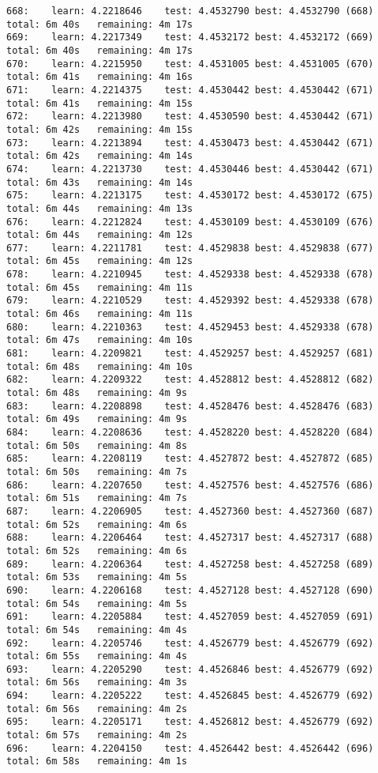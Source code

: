 \documentclass[11pt]{article}
\begin{document}
\begin{Verbatim}[commandchars=\\\{\}]
668:	learn: 4.2218646	test: 4.4532790	best: 4.4532790 (668)	total: 6m 40s	remaining: 4m 17s
669:	learn: 4.2217349	test: 4.4532172	best: 4.4532172 (669)	total: 6m 40s	remaining: 4m 17s
670:	learn: 4.2215950	test: 4.4531005	best: 4.4531005 (670)	total: 6m 41s	remaining: 4m 16s
671:	learn: 4.2214375	test: 4.4530442	best: 4.4530442 (671)	total: 6m 41s	remaining: 4m 15s
672:	learn: 4.2213980	test: 4.4530590	best: 4.4530442 (671)	total: 6m 42s	remaining: 4m 15s
673:	learn: 4.2213894	test: 4.4530473	best: 4.4530442 (671)	total: 6m 42s	remaining: 4m 14s
674:	learn: 4.2213730	test: 4.4530446	best: 4.4530442 (671)	total: 6m 43s	remaining: 4m 14s
675:	learn: 4.2213175	test: 4.4530172	best: 4.4530172 (675)	total: 6m 44s	remaining: 4m 13s
676:	learn: 4.2212824	test: 4.4530109	best: 4.4530109 (676)	total: 6m 44s	remaining: 4m 12s
677:	learn: 4.2211781	test: 4.4529838	best: 4.4529838 (677)	total: 6m 45s	remaining: 4m 12s
678:	learn: 4.2210945	test: 4.4529338	best: 4.4529338 (678)	total: 6m 45s	remaining: 4m 11s
679:	learn: 4.2210529	test: 4.4529392	best: 4.4529338 (678)	total: 6m 46s	remaining: 4m 11s
680:	learn: 4.2210363	test: 4.4529453	best: 4.4529338 (678)	total: 6m 47s	remaining: 4m 10s
681:	learn: 4.2209821	test: 4.4529257	best: 4.4529257 (681)	total: 6m 48s	remaining: 4m 10s
682:	learn: 4.2209322	test: 4.4528812	best: 4.4528812 (682)	total: 6m 48s	remaining: 4m 9s
683:	learn: 4.2208898	test: 4.4528476	best: 4.4528476 (683)	total: 6m 49s	remaining: 4m 9s
684:	learn: 4.2208636	test: 4.4528220	best: 4.4528220 (684)	total: 6m 50s	remaining: 4m 8s
685:	learn: 4.2208119	test: 4.4527872	best: 4.4527872 (685)	total: 6m 50s	remaining: 4m 7s
686:	learn: 4.2207650	test: 4.4527576	best: 4.4527576 (686)	total: 6m 51s	remaining: 4m 7s
687:	learn: 4.2206905	test: 4.4527360	best: 4.4527360 (687)	total: 6m 52s	remaining: 4m 6s
688:	learn: 4.2206464	test: 4.4527317	best: 4.4527317 (688)	total: 6m 52s	remaining: 4m 6s
689:	learn: 4.2206364	test: 4.4527258	best: 4.4527258 (689)	total: 6m 53s	remaining: 4m 5s
690:	learn: 4.2206168	test: 4.4527128	best: 4.4527128 (690)	total: 6m 54s	remaining: 4m 5s
691:	learn: 4.2205884	test: 4.4527059	best: 4.4527059 (691)	total: 6m 54s	remaining: 4m 4s
692:	learn: 4.2205746	test: 4.4526779	best: 4.4526779 (692)	total: 6m 55s	remaining: 4m 4s
693:	learn: 4.2205290	test: 4.4526846	best: 4.4526779 (692)	total: 6m 56s	remaining: 4m 3s
694:	learn: 4.2205222	test: 4.4526845	best: 4.4526779 (692)	total: 6m 56s	remaining: 4m 2s
695:	learn: 4.2205171	test: 4.4526812	best: 4.4526779 (692)	total: 6m 57s	remaining: 4m 2s
696:	learn: 4.2204150	test: 4.4526442	best: 4.4526442 (696)	total: 6m 58s	remaining: 4m 1s

\end{Verbatim}
\end{document}
